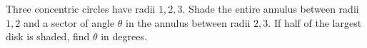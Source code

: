Three concentric circles have radii $1,2,3$. Shade the entire annulus between radii $1,2$ and a sector of angle $\theta$ in the annulus between radii $2,3$. If half of the largest disk is shaded, find $\theta$ in degrees.
